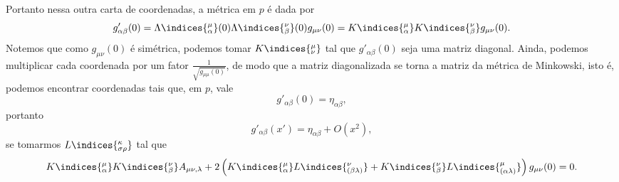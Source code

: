 Portanto nessa outra carta de coordenadas, a métrica em \(p\) é dada por
\begin{equation*}
    g'_{\alpha \beta}(0) = \Lambda\indices{^\mu_\alpha}(0)\Lambda\indices{^\nu_\beta}(0)g_{\mu\nu}(0) = K\indices{^\mu_\alpha}K\indices{^\nu_\beta}g_{\mu\nu}(0).
\end{equation*}
Notemos que como \(g_{\mu\nu}(0)\) é simétrica, podemos tomar \(K\indices{^\mu_\nu}\) tal que \(g'_{\alpha\beta}(0)\) seja uma matriz diagonal. Ainda, podemos multiplicar cada coordenada por um fator \(\frac{1}{\sqrt{g_{\mu\mu}(0)}}\), de modo que a matriz diagonalizada se torna a matriz da métrica de Minkowski, isto é, podemos encontrar coordenadas tais que, em \(p\), vale
\begin{equation*}
    g'_{\alpha\beta}(0) = \eta_{\alpha\beta},
\end{equation*}
portanto
\begin{equation*}
    g'_{\alpha \beta}(x') = \eta_{\alpha \beta} + O(x^2),
\end{equation*}
se tomarmos \(L\indices{^\kappa_{\sigma\rho}}\) tal que
\begin{equation*}
    K\indices{^\mu_\alpha}K\indices{^\nu_\beta}A_{\mu\nu,\lambda} + 2\left(K\indices{^\mu_\alpha}L\indices{^\nu_{(\beta\lambda)}} + K\indices{^\nu_\beta}L\indices{^\mu_{(\alpha\lambda)}}\right)g_{\mu\nu}(0) = 0.
\end{equation*}
